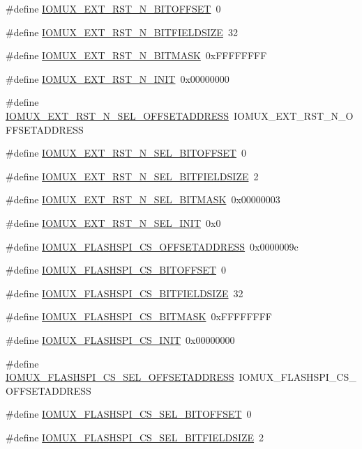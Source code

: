 \begin{DoxyCompactItemize}
\#define \hyperlink{a00560_a044803ccadc528c2871dbeb47e093326}{IOMUX\_\-EXT\_\-RST\_\-N\_\-BITOFFSET}~0
\item 
\#define \hyperlink{a00560_a96aad01198c02c2d03a0b1960eb91172}{IOMUX\_\-EXT\_\-RST\_\-N\_\-BITFIELDSIZE}~32
\item 
\#define \hyperlink{a00560_a74c03a8136670313bf857a71dffb63ad}{IOMUX\_\-EXT\_\-RST\_\-N\_\-BITMASK}~0xFFFFFFFF
\item 
\#define \hyperlink{a00560_a0465a1b4f34de502504dd0f36cfc54d5}{IOMUX\_\-EXT\_\-RST\_\-N\_\-INIT}~0x00000000
\item 
\#define \hyperlink{a00560_a10ae84eff9b58e9ccdb625a4f54840a8}{IOMUX\_\-EXT\_\-RST\_\-N\_\-SEL\_\-OFFSETADDRESS}~IOMUX\_\-EXT\_\-RST\_\-N\_\-OFFSETADDRESS
\item 
\#define \hyperlink{a00560_a291ac7c8cec7e3f631b0c33c8f8bd72f}{IOMUX\_\-EXT\_\-RST\_\-N\_\-SEL\_\-BITOFFSET}~0
\item 
\#define \hyperlink{a00560_a09facb16afba3aea94d8bc5023b4e96a}{IOMUX\_\-EXT\_\-RST\_\-N\_\-SEL\_\-BITFIELDSIZE}~2
\item 
\#define \hyperlink{a00560_a3f74eb2593578a7e168bf881f7a87536}{IOMUX\_\-EXT\_\-RST\_\-N\_\-SEL\_\-BITMASK}~0x00000003
\item 
\#define \hyperlink{a00560_a4ebf53e1d773983080905b771df0768d}{IOMUX\_\-EXT\_\-RST\_\-N\_\-SEL\_\-INIT}~0x0
\item 
\#define \hyperlink{a00560_a3a0f4cacd502c59384c83020065d4781}{IOMUX\_\-FLASHSPI\_\-CS\_\-OFFSETADDRESS}~0x0000009c
\item 
\#define \hyperlink{a00560_aaaf405eefc0a57d5dd996474009f7345}{IOMUX\_\-FLASHSPI\_\-CS\_\-BITOFFSET}~0
\item 
\#define \hyperlink{a00560_ad0b38c7c5d7dd9593e38e71148e47f1b}{IOMUX\_\-FLASHSPI\_\-CS\_\-BITFIELDSIZE}~32
\item 
\#define \hyperlink{a00560_a88f7d78cc932f3165282e256923ab911}{IOMUX\_\-FLASHSPI\_\-CS\_\-BITMASK}~0xFFFFFFFF
\item 
\#define \hyperlink{a00560_a12d2320efec14afc3efbf240f8fca57d}{IOMUX\_\-FLASHSPI\_\-CS\_\-INIT}~0x00000000
\item 
\#define \hyperlink{a00560_aaa0114da560b320d019cb3aba423eeef}{IOMUX\_\-FLASHSPI\_\-CS\_\-SEL\_\-OFFSETADDRESS}~IOMUX\_\-FLASHSPI\_\-CS\_\-OFFSETADDRESS
\item 
\#define \hyperlink{a00560_a12308386e8846fc7804deb8ac03b111b}{IOMUX\_\-FLASHSPI\_\-CS\_\-SEL\_\-BITOFFSET}~0
\item 
\#define \hyperlink{a00560_af3104e16917d32512ebf2953cfc4316a}{IOMUX\_\-FLASHSPI\_\-CS\_\-SEL\_\-BITFIELDSIZE}~2

\end{DoxyCompactItemize}
